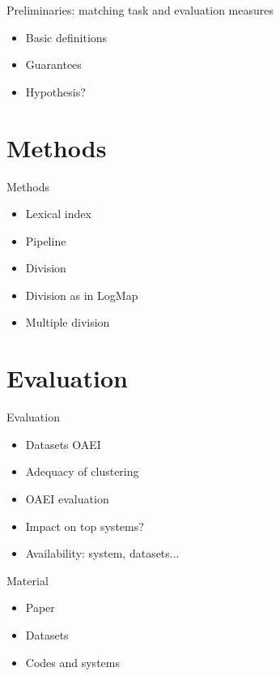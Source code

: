 \documentclass[t]{beamer}
\begin{document}
\begin{frame}{Preliminaries: matching task and evaluation measures}
	
  		\begin{itemize}    
  			\item Basic definitions
  			\item Guarantees
  			\item Hypothesis?
		\end{itemize}
  	
\end{frame}


\section{Methods}


\begin{frame}{Methods}
	
  		\begin{itemize}    
  			\item Lexical index
  			\item Pipeline
  			\item Division
  			\item Division as in LogMap
  			\item Multiple division
		\end{itemize}
  	
\end{frame}





\section{Evaluation}


\begin{frame}{Evaluation}
	
  		\begin{itemize}    
  			\item Datasets OAEI
  			\item Adequacy of clustering
  			\item OAEI evaluation
  			\item Impact on top systems?
  			\item Availability: system, datasets...
		\end{itemize}
  	
\end{frame}



\begin{frame}{Material}
	
  		\begin{itemize}    
  			\item Paper
  			\item Datasets
  			\item Codes and systems
		\end{itemize}
  	
\end{frame}
\end{document}

